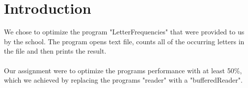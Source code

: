 \section{Introduction}
We chose to optimize the program "LetterFrequencies" that were provided to us by the school. The program opens text file, counts all of the occurring letters in the file and then prints the result.\\\\
Our assignment were to optimize the programs performance with at least 50\%, which we achieved by replacing the programs "reader" with a "bufferedReader".